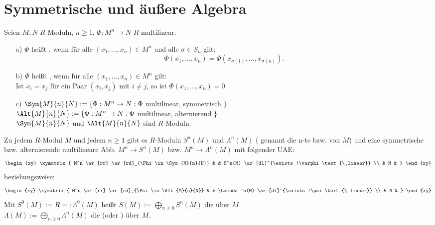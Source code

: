 \section{Symmetrische und äußere Algebra}

 \begin{Def} Seien $M,N$ $R$-Moduln, $n \geq 1$, $\Phi: M^n \rightarrow N$ $R$-multilinear.
  \begin{enumerate}
   \item[ a) ] $\Phi$ hei\ss t , wenn für alle $(x_1, \dots, x_n ) \in M^n$ und alle $\sigma \in S_n$ gilt:
    \[
    \Phi(x_1, \dots , x_n) = \Phi( x_{\sigma(1)},  \dots, x_{\sigma(n)}).
    \]
   \item[ b) ] $\Phi$ heißt , wenn für alle $(x_1, \dots, x_n ) \in M^n$ gilt:\\
    Ist $x_i = x_j$ für ein Paar $(x_i,x_j)$ mit $i \neq j$, so ist $\Phi(x_1, \dots , x_n) = 0$
   \item[ c) ] $\Sym{M}{n}{N} := \{ \Phi: M^n \rightarrow N: \Phi$ multilinear, symmetrisch $\}$\\
    $\Alt{M}{n}{N} := \{ \Phi: M^n \rightarrow N: \Phi$ multilinear, alternierend $\}$\\
	 $\Sym{M}{n}{N}$ und  $\Alt{M}{n}{N}$ sind $R$-Moduln.
  \end{enumerate}
 \end{Def}
 \begin{Satz} Zu jedem $R$-Modul $M$ und jedem $n \geq 1$ gibt es $R$-Moduln $S^n(M)$ und $\Lambda^n(M)$ ( genannt die n-te  bzw.  von $M$)
  und eine symmetrische bzw. alternierende multilineare Abb. $M^n \rightarrow S^n(M)$ bzw.  $M^n \rightarrow \Lambda ^n(M)$ mit folgender UAE:
\[
\begin{xy}
  \xymatrix{
      M^n \ar[rr] \ar[rd]_{\Phi\in \Sym{M}{n}{N}}  &     &  S^n(M) \ar[dl]^{\exists!\varphi\text{\ linear}}  \\
                             &  N  &
  }
\end{xy}
\]
beziehungsweise:
\[
\begin{xy}
  \xymatrix{
      M^n \ar[rr] \ar[rd]_{\Psi\in \Alt{M}{n}{N}}  &     &  \Lambda^n(M) \ar[dl]^{\exists!\psi\text{\ linear}}  \\
                             &  N  &
  }
\end{xy}
\]
  Mit $S^0(M) := R =: \Lambda^0(M)$ heißt $S(M):= \bigoplus_{n\geq 0} S^n(M)$ die  über $M$\\
  $\Lambda (M) := \bigoplus_{n\geq 0} \Lambda^n(M)$ die  (oder ) über $M$.
 \end{Satz}
 
